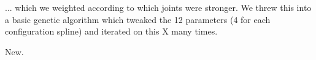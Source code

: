 

... which we weighted according to which joints were stronger.
We threw this into a basic genetic algorithm which tweaked the 12 parameters (4 for each configuration spline)
and iterated on this X many times. 

New.


